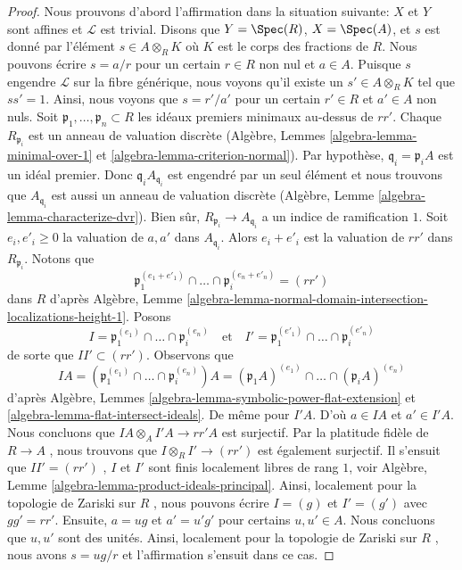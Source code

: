 \begin{proof}
\medskip\noindent
Nous prouvons d'abord l'affirmation dans la situation suivante:  $X$  et
 $Y$  sont affines et  $\mathcal{L}$  est trivial. Disons que  $Y = \Spec(R)$,
 $X = \Spec(A)$, et  $s$  est donné par l'élément  $s \in A \otimes_R K$  où
 $K$  est le corps des fractions de  $R$. Nous pouvons écrire
 $s = a/r$  pour un certain  $r \in R$  non nul et  $a \in A$. Puisque
 $s$  engendre  $\mathcal{L}$  sur la fibre générique, nous voyons qu'il
existe un  $s' \in A \otimes_R K$  tel que  $ss' = 1$. Ainsi, nous voyons que  $s = r'/a'$ 
pour un certain  $r' \in R$  et  $a' \in A$ non nuls. Soit  $\mathfrak p_1, \ldots, \mathfrak p_n \subset R$  les
idéaux premiers minimaux au-dessus de  $rr'$. Chaque  $R_{\mathfrak p_i}$  est un
anneau de valuation discrète (Algèbre, Lemmes  \ref{algebra-lemma-minimal-over-1}  et  \ref{algebra-lemma-criterion-normal}). Par
hypothèse,  $\mathfrak q_i = \mathfrak p_i A$  est un idéal premier. Donc  $\mathfrak q_i A_{\mathfrak q_i}$  est engendré par
un seul élément et nous trouvons que  $A_{\mathfrak q_i}$  est aussi un anneau de valuation
discrète (Algèbre, Lemme  \ref{algebra-lemma-characterize-dvr}). Bien sûr,  $R_{\mathfrak p_i} \to A_{\mathfrak q_i}$  a un indice de
ramification  $1$. Soit  $e_i, e'_i \geq 0$  la valuation de  $a, a'$  dans
 $A_{\mathfrak q_i}$. Alors  $e_i + e'_i$  est la valuation de  $rr'$  dans
 $R_{\mathfrak p_i}$. Notons que
$$
\mathfrak p_1^{(e_1 + e'_1)} \cap \ldots \cap \mathfrak p_i^{(e_n + e'_n)} =
(rr')
$$
dans  $R$  d'après Algèbre, Lemme  \ref{algebra-lemma-normal-domain-intersection-localizations-height-1}. Posons
$$
I = \mathfrak p_1^{(e_1)} \cap \ldots \cap \mathfrak p_i^{(e_n)}
\quad\text{et}\quad
I' = \mathfrak p_1^{(e'_1)} \cap \ldots \cap \mathfrak p_i^{(e'_n)}
$$
de sorte que  $II' \subset (rr')$. Observons que
$$
IA =
(\mathfrak p_1^{(e_1)} \cap \ldots \cap \mathfrak p_i^{(e_n)})A =
(\mathfrak p_1A)^{(e_1)} \cap \ldots \cap (\mathfrak p_i A)^{(e_n)}
$$
d'après Algèbre, Lemmes  \ref{algebra-lemma-symbolic-power-flat-extension}  et  \ref{algebra-lemma-flat-intersect-ideals}. De même pour  $I'A$.
D'où  $a \in IA$  et  $a' \in I'A$. Nous concluons que  $IA \otimes_A I'A \to rr'A$  est surjectif.
Par la platitude fidèle de  $R \to A$ , nous trouvons que  $I \otimes_R I' \to (rr')$  est
également surjectif. Il s'ensuit que  $II' = (rr')$ ,  $I$  et  $I'$ 
sont finis localement libres de rang  $1$, voir Algèbre, Lemme
 \ref{algebra-lemma-product-ideals-principal}. Ainsi, localement pour la topologie de Zariski sur  $R$ ,
nous pouvons écrire  $I = (g)$  et  $I' = (g')$  avec  $gg' = rr'$. Ensuite,
 $a = ug$  et  $a' = u'g'$  pour certains  $u, u' \in A$. Nous concluons que
 $u, u'$  sont des unités. Ainsi, localement pour la topologie de Zariski sur
 $R$ , nous avons  $s = ug/r$  et l'affirmation s'ensuit dans ce cas.


\end{proof}
